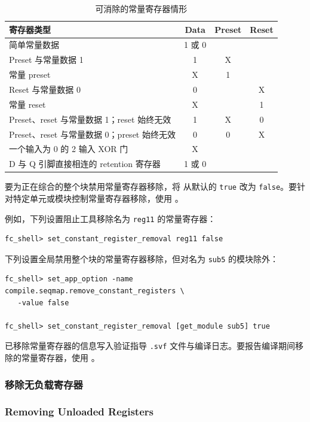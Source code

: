 \begin{table}[htbp]
\centering
\caption{可消除的常量寄存器情形}
\label{tab:const-reg-elim}
\small
\begin{tabularx}{\textwidth}{@{}X ccc@{}}
\toprule
\textbf{寄存器类型} & \textbf{Data} & \textbf{Preset} & \textbf{Reset} \\
\midrule
简单常量数据 & 1 或 0 &  &  \\
Preset 与常量数据 1 & 1 & X &  \\
常量 preset & X & 1 &  \\
Reset 与常量数据 0 & 0 &  & X \\
常量 reset & X &  & 1 \\
Preset、reset 与常量数据 1；reset 始终无效 & 1 & X & 0 \\
Preset、reset 与常量数据 0；preset 始终无效 & 0 & 0 & X \\
一个输入为 0 的 2 输入 XOR 门 & X &  &  \\
D 与 Q 引脚直接相连的 retention 寄存器 & 1 或 0 &  &  \\
\bottomrule
\end{tabularx}
\end{table}

要为正在综合的整个块禁用常量寄存器移除，将  从默认的 \texttt{true} 改为 \texttt{false}。要针对特定单元或模块控制常量寄存器移除，使用 。

例如，下列设置阻止工具移除名为 \texttt{reg11} 的常量寄存器：
\begin{lstlisting}
fc_shell> set_constant_register_removal reg11 false
\end{lstlisting}

下列设置全局禁用整个块的常量寄存器移除，但对名为 \texttt{sub5} 的模块除外：
\begin{lstlisting}
fc_shell> set_app_option -name compile.seqmap.remove_constant_registers \
   -value false

fc_shell> set_constant_register_removal [get_module sub5] true
\end{lstlisting}

已移除常量寄存器的信息写入验证指导 \texttt{.svf} 文件与编译日志。要报告编译期间移除的常量寄存器，使用 。

\subsubsection{移除无负载寄存器}
\subsubsection*{Removing Unloaded Registers}

